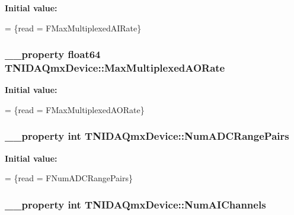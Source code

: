 {\bfseries Initial value\+:}
\begin{DoxyCode}
=
                \{read = FMaxMultiplexedAIRate\}
\end{DoxyCode}
\hypertarget{class_t_n_i_d_a_qmx_device_a9fbcd8b538029edaf70e414b7ba74652}{
\subsubsection[{Max\+Multiplexed\+A\+O\+Rate}]{\setlength{\rightskip}{0pt plus 5cm}\+\_\+\+\_\+property float64 T\+N\+I\+D\+A\+Qmx\+Device\+::\+Max\+Multiplexed\+A\+O\+Rate}}\label{class_t_n_i_d_a_qmx_device_a9fbcd8b538029edaf70e414b7ba74652}
{\bfseries Initial value\+:}
\begin{DoxyCode}
=
                \{read = FMaxMultiplexedAORate\}
\end{DoxyCode}
\hypertarget{class_t_n_i_d_a_qmx_device_a08942583f820d6d782ebafe0e219444b}{
\subsubsection[{Num\+A\+D\+C\+Range\+Pairs}]{\setlength{\rightskip}{0pt plus 5cm}\+\_\+\+\_\+property int T\+N\+I\+D\+A\+Qmx\+Device\+::\+Num\+A\+D\+C\+Range\+Pairs}}\label{class_t_n_i_d_a_qmx_device_a08942583f820d6d782ebafe0e219444b}
{\bfseries Initial value\+:}
\begin{DoxyCode}
=
                \{read = FNumADCRangePairs\}
\end{DoxyCode}
\hypertarget{class_t_n_i_d_a_qmx_device_a9d0b9542523a350f8c6a162211839f86}{
\subsubsection[{Num\+A\+I\+Channels}]{\setlength{\rightskip}{0pt plus 5cm}\+\_\+\+\_\+property int T\+N\+I\+D\+A\+Qmx\+Device\+::\+Num\+A\+I\+Channels}}\label{class_t_n_i_d_a_qmx_device_a9d0b9542523a350f8c6a162211839f86}

